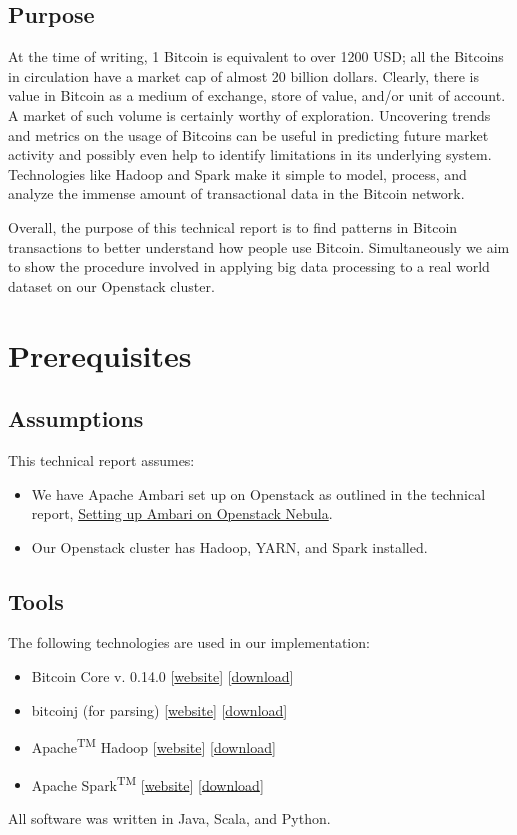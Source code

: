 \documentclass[9pt,twocolumn,twoside]{idsi}
\begin{document}
\subsection{Purpose}
At the time of writing, 1 Bitcoin is equivalent to over 1200 USD; all the Bitcoins in circulation have a market cap of almost 20 billion dollars. Clearly, there is value in Bitcoin as a medium of exchange, store of value, and/or unit of account. A market of such volume is certainly worthy of exploration. Uncovering trends and metrics on the usage of Bitcoins can be useful in predicting future market activity and possibly even help to identify limitations in its underlying system. Technologies like Hadoop and Spark make it simple to model, process, and analyze the immense amount of transactional data in the Bitcoin network.

Overall, the purpose of this technical report is to find patterns in Bitcoin transactions to better understand how people use Bitcoin. Simultaneously we aim to show the procedure involved in applying big data processing to a real world dataset on our Openstack cluster.

\section{Prerequisites}
\subsection{Assumptions}
This technical report assumes:
\begin{itemize}
    \item We have Apache Ambari set up on Openstack as outlined in the technical report, \href{https://github.com/lcdm-uiuc/idsi-core/blob/bitcoin_tr/reports/ambari_openstack_setup/ambari_openstack_setup.pdf}{Setting up Ambari on Openstack Nebula}.
    \item Our Openstack cluster has Hadoop, YARN, and Spark installed.
\end{itemize}
\subsection{Tools}
The following technologies are used in our implementation:
\begin{itemize}
    \item Bitcoin Core v. 0.14.0 [\href{https://bitcoin.org/en/bitcoin-core/}{website}] [\href{https://bitcoin.org/en/download}{download}]
    \item bitcoinj (for parsing) [\href{https://bitcoinj.github.io/}{website}] [\href{https://bitcoinj.github.io/#getting-started}{download}]
    \item Apache\textsuperscript{TM} Hadoop\textsuperscript{\textregistered} [\href{http://hadoop.apache.org}{website}] [\href{http://hadoop.apache.org/#Download+Hadoop}{download}]
    \item Apache Spark\textsuperscript{TM} [\href{http://spark.apache.org/}{website}] [\href{http://spark.apache.org/downloads.html}{download}]
\end{itemize}
All software was written in Java, Scala, and Python.
\end{document}
